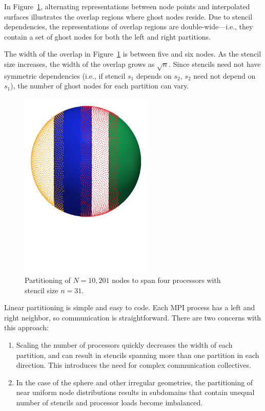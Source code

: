 \documentclass{report}
\begin{document}
In Figure~\ref{fig:decomposed_sphere}, alternating representations between node points and interpolated surfaces illustrates the
overlap regions where ghost nodes reside. Due to stencil dependencies, the representations of overlap regions are double-wide---i.e., they contain a set of ghost nodes for both the left and right partitions. 

The width of the overlap in Figure~\ref{fig:decomposed_sphere} is between five and six nodes. As the stencil size increases, the width of the
overlap grows as $\sqrt{n}$. Since stencils need not have symmetric dependencies (i.e., if stencil $s_1$ depends on $s_2$, $s_2$ need not depend on $s_1$), the number of ghost nodes for each partition can vary. 

\begin{figure}[ht!]
\begin{center}
\includegraphics[width=2.5in]{../figures/paper1/figures/vortex_rollup/4procs_N10K_n31.pdf}
\caption{Partitioning of $N=10,201$ nodes to span four processors with stencil size $n=31$. }
\label{fig:decomposed_sphere}
\end{center}
\end{figure}

Linear partitioning is simple and easy to code. Each MPI process has a left and right neighbor, so communication is straightforward. There are two concerns with this approach: 
\begin{enumerate} 
\item Scaling the number of processors quickly decreases the width of each partition, and can result in stencils spanning more than one partition in each direction. This introduces the need for complex communication collectives. 
\item In the case of the sphere and other irregular geometries, the partitioning of near uniform node distributions results in subdomains that contain unequal number of stencils and processor loads become imbalanced. 
\end{enumerate}
\end{document}
